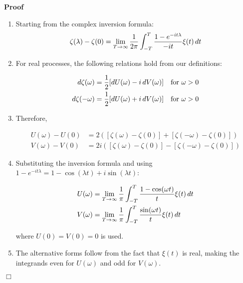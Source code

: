 \documentclass{article}
\newenvironment{proof}{\noindent\textbf{Proof\ }}{\hspace*{\fill}$\Box$\medskip}
\begin{document}
\begin{proof}
  \begin{enumerate}
    \\
    \item Starting from the complex inversion formula:
    \begin{equation}
      \zeta (\lambda) - \zeta (0) = \lim_{T \to \infty}  \frac{1}{2 \pi} 
      \int_{- T}^T \frac{1 - e^{- it \lambda}}{- it} \xi (t)  \hspace{0.17em}
      dt
    \end{equation}
    \item For real processes, the following relations hold from our
    definitions:
    
    \begin{align}
      d \zeta (\omega) & = \frac{1}{2}  [dU (\omega) - i \hspace{0.17em} dV
      (\omega)]  \quad \text{for } \omega > 0 \\
      d \zeta (- \omega) & = \frac{1}{2}  [dU (\omega) + i \hspace{0.17em} dV
      (\omega)]  \quad \text{for } \omega > 0 
    \end{align}
    
    \item Therefore,
    
    \begin{align}
      U (\omega) - U (0) & = 2 ([\zeta (\omega) - \zeta (0)] + [\zeta (-
      \omega) - \zeta (0)]) \\
      V (\omega) - V (0) & = 2 i ([\zeta (\omega) - \zeta (0)] - [\zeta (-
      \omega) - \zeta (0)]) 
    \end{align}
    
    \item Substituting the inversion formula and using $1 - e^{- it \lambda} =
    1 - \cos (\lambda t) + i \sin (\lambda t)$:
    
    \begin{align}
      U (\omega) & = \lim_{T \to \infty}  \frac{1}{\pi}  \int_{- T}^T \frac{1
      - \cos (\omega t)}{t} \xi (t)  \hspace{0.17em} dt \\
      V (\omega) & = \lim_{T \to \infty}  \frac{1}{\pi}  \int_{- T}^T
      \frac{\sin (\omega t)}{t} \xi (t)  \hspace{0.17em} dt 
    \end{align}
    
    where $U (0) = V (0) = 0$ is used.
    
    \item The alternative forms follow from the fact that $\xi (t)$ is real,
    making the integrands even for $U (\omega)$ and odd for $V (\omega)$.
  \end{enumerate}
\end{proof}
\end{document}
